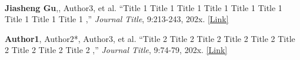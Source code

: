 
\begin{cventries}
	
	\cventry
	{} %
	{\ } %
	{\ } %
	{} %
{   	\vspace{-8mm}
	\begin{cvitemize2}
		\item \textbf{Jiasheng Gu},, Author3, et al. ``Title 1 Title 1 Title 1 Title 1 Title 1 Title 1 Title 1 Title 1 Title 1 ,'' \textit{Journal Title}, 9:213-243, 202x.  \href{https://ieeexplore.ieee.org/12345}{\textcolor{link}{ [Link]}} 
		\vspace{1mm}	
		\item \textbf{Author1},  Author2*, Author3, et al. ``Title 2 Title 2 Title 2 Title 2 Title 2 Title 2 Title 2 Title 2 Title 2 ,'' \textit{Journal Title}, 9:74-79, 202x.  \href{https://ieeexplore.ieee.org/document/54321}{\textcolor{link}{[Link]}}
	\end{cvitemize2}
	\vspace{-4mm}
}
	
	
\end{cventries}
